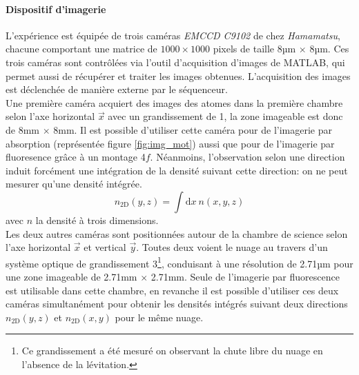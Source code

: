 \paragraph*{Dispositif d'imagerie}
L'expérience est équipée de trois caméras \textit{EMCCD C9102} de chez \textit{Hamamatsu}, chacune comportant une matrice de $1000 \times 1000$ pixels de taille 8µm $\times$ 8µm. Ces trois caméras sont contrôlées via l'outil d'acquisition d'images de MATLAB, qui permet aussi de récupérer et traiter les images obtenues. L'acquisition des images est déclenchée de manière externe par le séquenceur.\\
Une première caméra acquiert des images des atomes dans la première chambre selon l'axe horizontal $\vec{x}$ avec un grandissement de 1, la zone imageable est donc de 8mm $\times$ 8mm. Il est possible d'utiliser cette caméra pour de l'imagerie par absorption (représentée figure \ref{fig:img_mot}) aussi que pour de l'imagerie par fluoresence grâce à un montage 4$f$. Néanmoins, l'observation selon une direction induit forcément une intégration de la densité suivant cette direction: on ne peut mesurer qu'une densité intégrée.
\begin{equation}
n_{\mathrm{2D}}(y,z) =\int{\mathrm{d}x \: n(x,y,z)}
\end{equation}
avec $n$ la densité à trois dimensions.\\
Les deux autres caméras sont positionnées autour de la chambre de science selon l'axe horizontal $\vec{x}$ et vertical $\vec{y}$. Toutes deux voient le nuage au travers d'un système optique de grandissement 3\footnote{Ce grandissement a été mesuré on observant la chute libre du nuage en l'absence de la lévitation.}, conduisant à une résolution de 2.71µm pour une zone imageable de 2.71mm $\times$ 2.71mm. Seule de l'imagerie par fluorescence est utilisable dans cette chambre, en revanche il est possible d'utiliser ces deux caméras simultanément pour obtenir les densités intégrés suivant deux directions $n_{\mathrm{2D}}(y,z)$ et $n_{\mathrm{2D}}(x,y)$ pour le même nuage.

